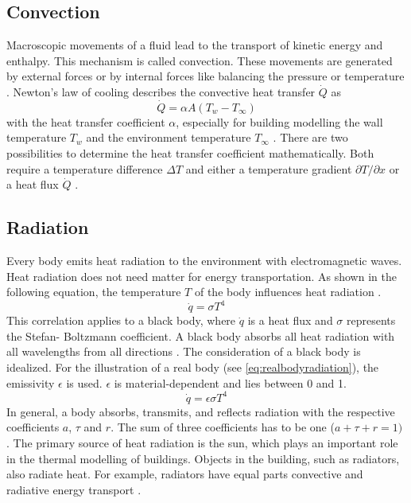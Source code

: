 \subsection{Convection}
\label{subsection:convection}

    Macroscopic movements of a fluid lead to the transport of kinetic energy and enthalpy. This mechanism is called convection. These movements are generated by external forces or by internal forces like balancing the pressure or temperature \cite{.2013}.
    \newline
    Newton's law of cooling describes the convective heat transfer $\dot{Q}$ as 
    \begin{equation}
    \label{eq:newton}
        \dot{Q} = \alpha A (T_w - T_\infty)
    \end{equation}
    with the heat transfer coefficient $\alpha$,  especially for building modelling the wall temperature $T_w$ and the environment temperature $T_\infty$ \cite{Griesinger.2019}. There are two possibilities to determine the heat transfer coefficient mathematically. Both require a temperature difference $\Delta T$ and either a temperature gradient $\partial T/\partial x$  or a heat flux $\dot{Q}$ \cite{.2013}. 

\subsection{Radiation}
\label{subsection:radiation}

    Every body emits heat radiation to the environment with electromagnetic waves. Heat radiation does not need matter for energy transportation. As shown in the following equation, the temperature $T$ of the body influences heat radiation \cite{.2013}. 
    \begin{equation}
    \label{eq:radiation}
        \dot{q} = \sigma T^4
    \end{equation}
    This correlation applies to a black body, where $\dot{q}$ is a heat flux and $\sigma$ represents the Stefan- Boltzmann coefficient. A black body absorbs all heat radiation with all wavelengths from all directions \cite{Griesinger.2019}. The consideration of a black body is idealized. For the illustration of a real body (see \autoref{eq:realbodyradiation}), the emissivity $\epsilon$ is used. $\epsilon$ is material-dependent and lies between 0 and 1.
    \begin{equation}
    \label{eq:realbodyradiation}
        \dot{q} = \epsilon \sigma T^4
    \end{equation}
    In general, a body absorbs, transmits, and reflects radiation with the respective coefficients $a$, $\tau$ and $r$. The sum of three coefficients has to be one ($a + \tau + r = 1)$
    \cite{Baehr.2016}.
    \newline
    The primary source of heat radiation is the sun, which plays an important role in the thermal modelling of buildings. Objects in the building, such as radiators, also radiate heat. For example, radiators have equal parts convective and radiative energy transport \cite{Hazyuk.2012}. 
    
